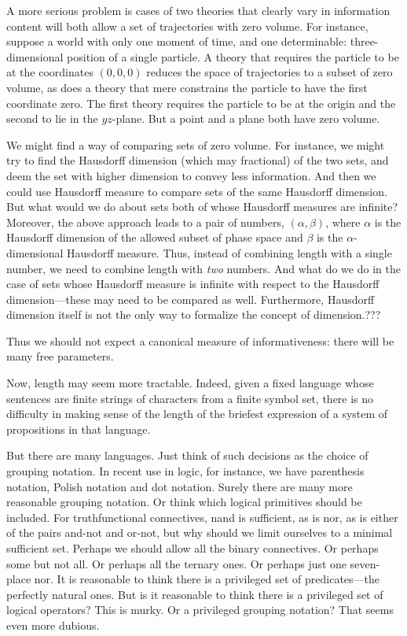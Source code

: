 A more serious problem is 
cases of two theories that clearly vary in information content will both allow a set of trajectories with zero volume. For instance, 
suppose a world with only one moment of time, and one determinable: three-dimensional position of a single
particle. A theory that requires the particle to be at the coordinates $(0,0,0)$ reduces the space of trajectories to a subset of zero
volume, as does a theory that mere constrains the particle to have the first coordinate zero. The first theory requires the particle to 
be at the origin and the second to lie in the $yz$-plane. But a point and a plane both have zero volume. 

We might find a way of comparing sets of zero volume. For instance, we might try to find the Hausdorff dimension (which may fractional)
of the two sets, and deem the set with higher dimension to convey less information. And then we could use Hausdorff measure to compare
sets of the same Hausdorff dimension. But what would we do about sets both of whose Hausdorff measures are infinite? Moreover, the above
approach leads to a pair of numbers, $(\alpha,\beta)$, where $\alpha$ is the Hausdorff dimension of the allowed subset of phase space
and $\beta$ is the $\alpha$-dimensional Hausdorff measure. Thus, instead of combining length with a single number, we need to combine length
with \textit{two} numbers. And what do we do in the case of sets whose Hausdorff measure is infinite with respect to the Hausdorff dimension---these
may need to be compared as well. Furthermore, Hausdorff dimension itself
is not the only way to formalize the concept of dimension.???

Thus we should not expect a canonical measure of informativeness: there will be many free parameters.

Now, length may seem more tractable. Indeed, given a fixed language whose sentences are
finite strings of characters from a finite symbol set, there is no difficulty in making sense of the length of the briefest 
expression of a system of propositions in that language. 

But there are many languages. Just think of such decisions as the choice of grouping notation. In recent
use in logic, for instance, we have parenthesis notation, Polish notation and dot notation. Surely there are many more
reasonable grouping notation. Or think which logical primitives should be included. For truthfunctional connectives,
nand is sufficient, as is nor, as is either of the pairs and-not and or-not, but why should we limit ourselves to a minimal 
sufficient set. Perhaps we should allow all the binary connectives. Or perhaps some but not all. Or perhaps all the ternary
ones. Or perhaps just one seven-place nor. It is reasonable to think there is a privileged set of predicates---the perfectly 
natural ones. But is it reasonable to think there is a privileged set of logical operators? This is murky. Or a privileged
grouping notation? That seems even more dubious.

